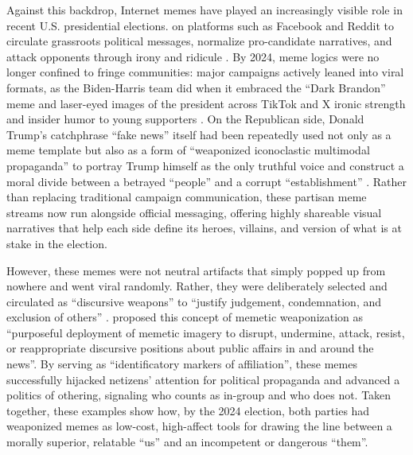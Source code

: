 \documentclass[12pt,twoside]{article}
\begin{document}

Against this backdrop, Internet memes have played an increasingly visible role in recent U.S. presidential elections. on platforms such as Facebook and Reddit to circulate grassroots political messages, normalize pro-candidate narratives, and attack opponents through irony and ridicule \parencite{hunting2020popularmediamemes, moodyramirez2019facebookmemegroups}. By 2024, meme logics were no longer confined to fringe communities: major campaigns actively leaned into viral formats, as the Biden-Harris team did when it embraced the ``Dark Brandon'' meme and laser-eyed images of the president across TikTok and X ironic strength and insider humor to young supporters \parencite{robertson2024bidenmemelord,mielczarek2024darkbrandonenthymeme}. On the Republican side, Donald Trump's catchphrase ``fake news'' itself had been repeatedly used not only as a meme template but also as a form of ``weaponized iconoclastic multimodal propaganda'' \parencite{smith2019weaponizediconoclasm} to portray Trump himself as the only truthful voice and construct a moral divide between a betrayed ``people'' and a corrupt ``establishment'' \parencite{ross2018discursivedeflection,woodward2020fakenewsguide}. Rather than replacing traditional campaign communication, these partisan meme streams now run alongside official messaging, offering highly shareable visual narratives that help each side define its heroes, villains, and version of what is at stake in the election.

However, these memes were not neutral artifacts that simply popped up from nowhere and went viral randomly. Rather, they were deliberately selected and circulated as ``discursive weapons'' to ``justify judgement, condemnation, and exclusion of others'' \parencite[495]{nissenbaum2017contestedculturalcapital}. \textcite{peters2021weaponizingmemes} proposed this concept of memetic weaponization as ``purposeful deployment of memetic imagery to disrupt, undermine, attack, resist, or reappropriate discursive positions about public affairs in and around the news''. By serving as ``identificatory markers of affiliation'', these memes successfully hijacked netizens' attention for political propaganda \parencite{olsen2018weaponizedmemes} and advanced a politics of othering, signaling who counts as in-group and who does not.
Taken together, these examples show how, by the 2024 election, both parties had weaponized memes as low-cost, high-affect tools for drawing the line between a morally superior, relatable ``us'' and an incompetent or dangerous ``them''. 
\end{document}
